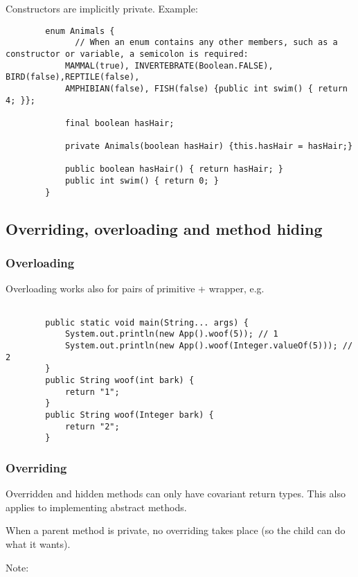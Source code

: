 \documentclass{scrartcl}
\begin{document}
    Constructors are implicitly private. Example:

     \begin{lstlisting}
        enum Animals {
              // When an enum contains any other members, such as a constructor or variable, a semicolon is required:
            MAMMAL(true), INVERTEBRATE(Boolean.FALSE), BIRD(false),REPTILE(false),
            AMPHIBIAN(false), FISH(false) {public int swim() { return 4; }};

            final boolean hasHair;

            private Animals(boolean hasHair) {this.hasHair = hasHair;}

            public boolean hasHair() { return hasHair; }
            public int swim() { return 0; }
        }

    \end{lstlisting}

\subsection{Overriding, overloading and method hiding}
\subsubsection{Overloading}

    Overloading works also for pairs of primitive + wrapper, e.g.

    \begin{lstlisting}

        public static void main(String... args) {
            System.out.println(new App().woof(5)); // 1
            System.out.println(new App().woof(Integer.valueOf(5))); // 2
        }
        public String woof(int bark) {
            return "1";
        }
        public String woof(Integer bark) {
            return "2";
        }
    \end{lstlisting}

\subsubsection{Overriding}

    Overridden and hidden methods can only have covariant return types.
    This also applies to implementing abstract methods.

    When a parent method is private, no overriding takes place (so the child can do what it wants).

    Note:
\end{document}
